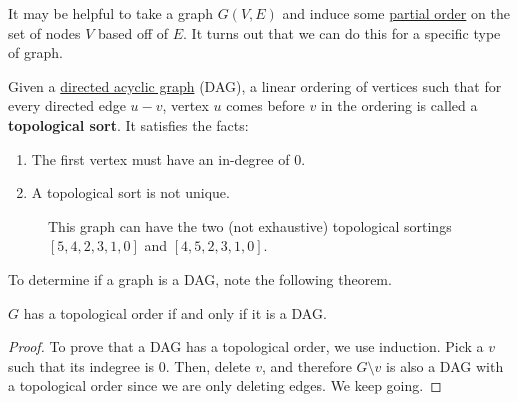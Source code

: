   It may be helpful to take a graph $G(V, E)$ and induce some \hyperref[st-def:partial-order]{partial order} on the set of nodes $V$ based off of $E$. It turns out that we can do this for a specific type of graph. 
  
  \begin{definition}
    \label{def:topological-sort}
    Given a \hyperref[def:directed-acyclic-graph]{directed acyclic graph} (DAG), a linear ordering of vertices such that for every directed edge $u-v$, vertex $u$ comes before $v$ in the ordering is called a \textbf{topological sort}. It satisfies the facts: 
    \begin{enumerate}
      \item The first vertex must have an in-degree of $0$. 
      \item A topological sort is not unique. 
    \end{enumerate}

    \begin{figure}[H]
      \centering 
      \caption{This graph can have the two (not exhaustive) topological sortings $[5, 4, 2, 3, 1, 0]$ and $[4, 5, 2, 3, 1, 0]$.}
      \label{fig:top_sort_not_unique}
    \end{figure}
  \end{definition}

  To determine if a graph is a DAG, note the following theorem. 

  \begin{theorem}
    \label{thm:topological-order-and-dags}
    $G$ has a topological order if and only if it is a DAG. 
  \end{theorem}
  \begin{proof}
    To prove that a DAG has a topological order, we use induction. Pick a $v$ such that its indegree is $0$. Then, delete $v$, and therefore $G \setminus v$ is also a DAG with a topological order since we are only deleting edges. We keep going. 
  \end{proof}

